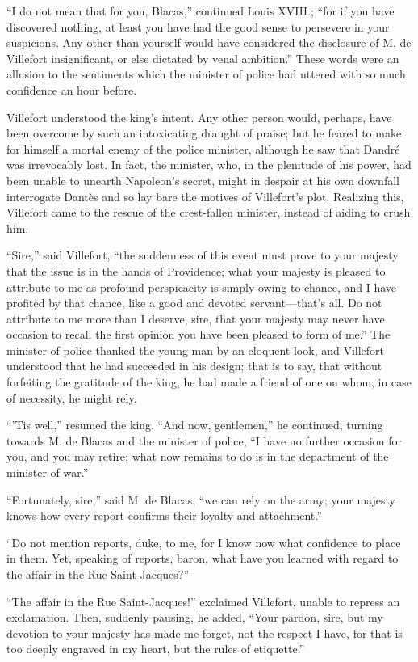 “I do not mean that for you, Blacas,” continued Louis XVIII.; “for if
you have discovered nothing, at least you have had the good sense to
persevere in your suspicions. Any other than yourself would have
considered the disclosure of M. de Villefort insignificant, or else
dictated by venal ambition.” These words were an allusion to the
sentiments which the minister of police had uttered with so much
confidence an hour before.

Villefort understood the king’s intent. Any other person would,
perhaps, have been overcome by such an intoxicating draught of praise;
but he feared to make for himself a mortal enemy of the police
minister, although he saw that Dandré was irrevocably lost. In fact,
the minister, who, in the plenitude of his power, had been unable to
unearth Napoleon’s secret, might in despair at his own downfall
interrogate Dantès and so lay bare the motives of Villefort’s plot.
Realizing this, Villefort came to the rescue of the crest-fallen
minister, instead of aiding to crush him.

“Sire,” said Villefort, “the suddenness of this event must prove to
your majesty that the issue is in the hands of Providence; what your
majesty is pleased to attribute to me as profound perspicacity is
simply owing to chance, and I have profited by that chance, like a good
and devoted servant—that’s all. Do not attribute to me more than I
deserve, sire, that your majesty may never have occasion to recall the
first opinion you have been pleased to form of me.” The minister of
police thanked the young man by an eloquent look, and Villefort
understood that he had succeeded in his design; that is to say, that
without forfeiting the gratitude of the king, he had made a friend of
one on whom, in case of necessity, he might rely.

“’Tis well,” resumed the king. “And now, gentlemen,” he continued,
turning towards M. de Blacas and the minister of police, “I have no
further occasion for you, and you may retire; what now remains to do is
in the department of the minister of war.”

“Fortunately, sire,” said M. de Blacas, “we can rely on the army; your
majesty knows how every report confirms their loyalty and attachment.”

“Do not mention reports, duke, to me, for I know now what confidence to
place in them. Yet, speaking of reports, baron, what have you learned
with regard to the affair in the Rue Saint-Jacques?”

“The affair in the Rue Saint-Jacques!” exclaimed Villefort, unable to
repress an exclamation. Then, suddenly pausing, he added, “Your pardon,
sire, but my devotion to your majesty has made me forget, not the
respect I have, for that is too deeply engraved in my heart, but the
rules of etiquette.”

